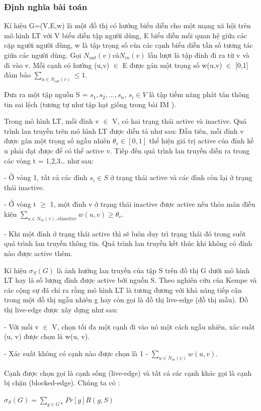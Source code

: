 		\subsubsection{Định nghĩa bài toán}
		Kí hiệu G=(V,E,w) là một đồ thị có hướng biểu diễn cho một mạng xã hội trên mô hình LT với V biểu diễn tập người dùng, E biểu diễn mối quan hệ giữa các cặp người người dùng, w là tập trọng số của các cạnh biểu diễn tần số tương tác giữa các người dùng. Gọi $N_{out}(v) và N_{in}(v)$ lần lượt là tập đỉnh đi ra từ v và đi vào v. Mỗi cạnh có hướng (u,v) $\in$ E được gán một trọng số w(u,v) $\in$ [0,1] đảm bảo $\sum_{u \in N_{out}(v)} \leq 1$.
		
		Đưa ra một tập nguồn S = {$s_{1}, s_{2}, ... , s_{n}$}, $s_{i} \in V$ là tập tiềm năng phát tán thông tin sai lệch (tương tự như tập hạt giống trong bài IM \cite{kempe21}).
		
		Trong mô hình LT, mỗi đỉnh v $\in$ V, có hai trạng thái active và inactive. Quá trình lan truyền trên mô hình LT được diễn tả như sau: Đầu tiên, mỗi đỉnh v được gán một trọng số ngẫu nhiên $\theta_{v} \in [0,1]$ thể hiện giá trị active của đỉnh kề u phải đạt được để có thể active v. Tiếp đến quá trình lan truyền diễn ra trong các vòng t = 1,2,3… như sau: 		
		
		- Ở vòng 1, tất cả các đỉnh $s_{i} \in S$ ở trạng thái active và các đỉnh còn lại ở trạng thái inactive.
		
		- Ở vòng t $\geq$ 1, một đỉnh v ở trạng thái inactive được active nếu thỏa mãn điều kiện $\sum_{u \in N_{in}(v), v là active} w(u,v) \geq \theta_{v}$.
		
		- Khi một đỉnh ở trạng thái active thì sẽ luôn duy trì trạng thái đó trong suốt quá trình lan truyền thông tin. Quá trình lan truyền kết thúc khi không có đỉnh nào được active thêm.	
		
		Kí hiệu $\sigma_{S}(G)$ là ảnh hưởng lan truyền của tập S trên đồ thị G dưới mô hình LT hay là số lượng đỉnh được active bởi nguồn S. Theo nghiên cứu của Kempe và các cộng sự đã chỉ ra rằng mô hình LT là tương đương với khả năng tiếp cận trong một đồ thị ngẫu nhiên g hay còn gọi là đồ thị live-edge (đồ thị mẫu). Đồ thị live-edge được xây dựng như sau:
		
		- Với mỗi v $\in$ V, chọn tối đa một cạnh đi vào nó một cách ngẫu nhiên, xác suất (u, v) được chọn là w(u, v).
		
		- Xác suất không có cạnh nào được chọn là 1 - $\sum_{u \in N_{in}(v)} w(u,v)$.
		
		Cạnh được chọn gọi là cạnh sống (live-edge) và tất cả các cạnh khác gọi là cạnh bị chặn (blocked-edge). Chúng ta có :
		\begin{center}
			 $\sigma_{S}(G) = \sum_{g \in G*} Pr[g]R(g, S)$			
		\end{center} 
	
